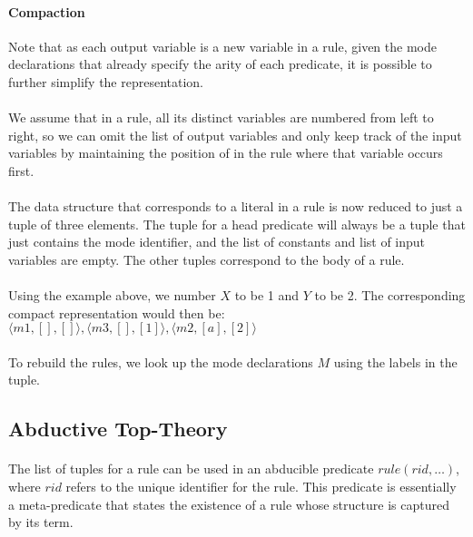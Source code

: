 \documentclass{article}
\theoremstyle{plain}
\theoremstyle{definition}
\begin{document}
\begin{multicols}{2}
\paragraph{Compaction} Note that as each output variable is a new variable in a rule, given the mode declarations that already specify the arity of each predicate, it is possible to further simplify the representation. 

\paragraph{} We assume that in a rule, all its distinct variables are numbered from left to right, so we can omit the list of output variables and only keep track of the input variables by maintaining the position of in the rule where that variable occurs first.

\paragraph{} The data structure that corresponds to a literal in a rule is now reduced to just a tuple of three elements. The tuple for a head predicate will always be a tuple that just contains the mode identifier,  and the list of constants and list of input variables are empty. The other tuples correspond to the body of a rule. 

\paragraph{} Using the example above, we number $X$ to be 1 and $Y$ to be 2. The corresponding compact representation would then be: $\langle m1, [], []\rangle, \langle m3, [], [1] \rangle, \langle m2, [a], [2] \rangle$

\paragraph{} To rebuild the rules, we look up the mode declarations $M$ using the labels in the tuple.

\subsection{Abductive Top-Theory}

\paragraph{} The list of tuples for a rule can be used in an abducible predicate $rule(rid, \dots)$, where $rid$ refers to the unique identifier for the rule. This predicate is essentially a meta-predicate that states the existence of a rule whose structure is captured by its term. 


\end{multicols}
\end{document}
